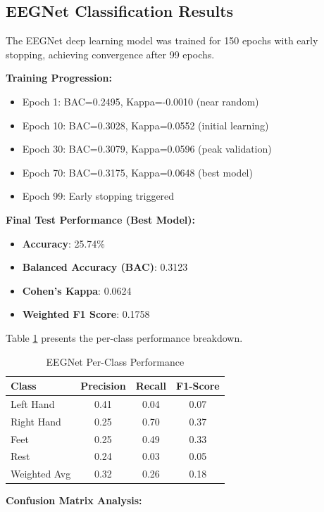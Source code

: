 \documentclass[conference]{IEEEtran}
\begin{document}
\subsection{EEGNet Classification Results}

The EEGNet deep learning model was trained for 150 epochs with early stopping, achieving convergence after 99 epochs.

\textbf{Training Progression:}
\begin{itemize}
    \item Epoch 1: BAC=0.2495, Kappa=-0.0010 (near random)
    \item Epoch 10: BAC=0.3028, Kappa=0.0552 (initial learning)
    \item Epoch 30: BAC=0.3079, Kappa=0.0596 (peak validation)
    \item Epoch 70: BAC=0.3175, Kappa=0.0648 (best model)
    \item Epoch 99: Early stopping triggered
\end{itemize}

\textbf{Final Test Performance (Best Model):}
\begin{itemize}
    \item \textbf{Accuracy}: 25.74\%
    \item \textbf{Balanced Accuracy (BAC)}: 0.3123
    \item \textbf{Cohen's Kappa}: 0.0624
    \item \textbf{Weighted F1 Score}: 0.1758
\end{itemize}

Table \ref{tab:eegnet_classreport} presents the per-class performance breakdown.

\begin{table}[htbp]
\centering
\caption{EEGNet Per-Class Performance}
\label{tab:eegnet_classreport}
\begin{tabular}{lccc}
\toprule
\textbf{Class} & \textbf{Precision} & \textbf{Recall} & \textbf{F1-Score} \\
\midrule
Left Hand & 0.41 & 0.04 & 0.07 \\
Right Hand & 0.25 & 0.70 & 0.37 \\
Feet & 0.25 & 0.49 & 0.33 \\
Rest & 0.24 & 0.03 & 0.05 \\
\midrule
Weighted Avg & 0.32 & 0.26 & 0.18 \\
\bottomrule
\end{tabular}
\end{table}

\textbf{Confusion Matrix Analysis:}
\end{document}
